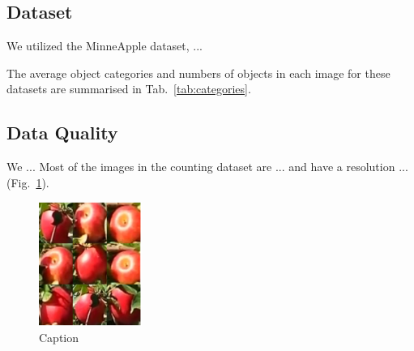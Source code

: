 \subsection{Dataset}
We utilized the MinneApple dataset, ...

The average object categories and numbers of objects in each image for these datasets are summarised in Tab.~\ref{tab:categories}.  

\begin{table}[htb]
\centering
\caption{Number of categories contained in each image and the number of instances of each category of the four datasets~\citep{Haeni2020}}
\label{tab:categories}
\end{table}


\subsection{Data Quality}
We ... Most of the images in the counting dataset are ... and have a resolution ... (Fig.~\ref{fig:counting dataset images}).

\begin{figure}[htb]
    \centering
    \includegraphics[width=0.3\textwidth]{images/counting_dataset.png}
    \caption{Caption~\citep{Haeni2020}}
    \label{fig:counting dataset images}
\end{figure}




